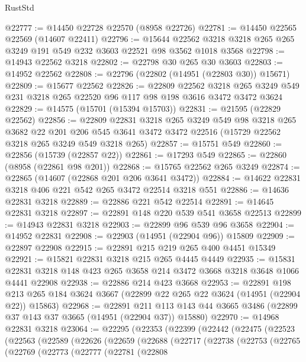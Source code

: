 \begin{lexlean}{RustStd}
\begin{coremodule}
@22777 := @14450 @22728 @22570 (@8958 @22726)
@22781 := @14450 @22565 @22569 (@14607 @22411)
@22796 := @15644
    @22562
    @3218
    @3218
    @265
    @265
    @3249
    @191
    @549
    @232
    @3603
    @22521
    @98
    @3562
    @1018
    @3568
@22798 := @14943 @22562 @3218
@22802 := @22798 @30 @265 @30 @3603
@22803 := @14952 @22562
@22808 := @22796 (@22802 (@14951 (@22803 @30)) @15671)
@22809 := @15677 @22562
@22826 := @22809
    @22562
    @3218
    @265
    @3249
    @549
    @231
    @3218
    @265
    @22520
    @96
    @117
    @98
    @198
    @3616
    @3472
    @3472
    @3624
@22829 := @14575 (@15701 (@15394 @15703))
@22831 := @21595 (@22829 @22562)
@22856 := @22809
    @22831
    @3218
    @265
    @3249
    @549
    @98
    @3218
    @265
    @3682
    @22
    @201
    @206
    @545
    @3641
    @3472
    @3472
    @22516
    (@15729 @22562 @3218 @265 @3249 @549 @3218 @265)
@22857 := @15751 @549
@22860 := @22856 (@15739 (@22857 @22))
@22861 := @17293 @549
@22865 := @22860 (@8958 (@22861 @98 @201))
@22868 := @15765 @22562 @265 @3249
@22874 := @22865 (@14607 (@22868 @201 @206 @3641 @3472))
@22884 := @14622 @22831 @3218 @406 @221 @542 @265 @3472 @22514 @3218 @551
@22886 := @14636 @22831 @3218
@22889 := @22886 @221 @542 @22514
@22891 := @14645 @22831 @3218
@22897 := @22891 @148 @220 @539 @541 @3658 @22513
@22899 := @14943 @22831 @3218
@22903 := @22899 @96 @539 @96 @3658
@22904 := @14952 @22831
@22908 := @22903 (@14951 (@22904 @96)) @15809
@22909 := @22897 @22908
@22915 := @22891 @215 @219 @265 @400 @4451 @15349
@22921 := @15821 @22831 @3218 @215 @265 @4445 @4449
@22935 := @15831 @22831 @3218 @148 @423 @265 @3658 @214 @3472 @3668 @3218 @3648 @1066 @4441 @22908
@22938 := @22886 @214 @423 @3668
@22953 := @22891
    @198
    @213
    @265
    @184
    @3624
    @3667
    (@22899 @22 @265 @22 @3624 (@14951 (@22904 @22)) @15863)
@22968 := @22891
    @211
    @113
    @143
    @44
    @3665
    @3486
    (@22899 @37 @143 @37 @3665 (@14951 (@22904 @37)) @15880)
@22970 := @14968 @22831 @3218
@23064 := @22295
    (@22353
      (@22399
        (@22442
          (@22475
            (@22523
              (@22563
                (@22589
                  (@22626
                    (@22659
                      (@22688
                        (@22717
                          (@22738
                            (@22753
                              (@22765
                                (@22769
                                  (@22773
                                    (@22777
                                      (@22781
                                        (@22808

\end{coremodule}
\end{lexlean}
